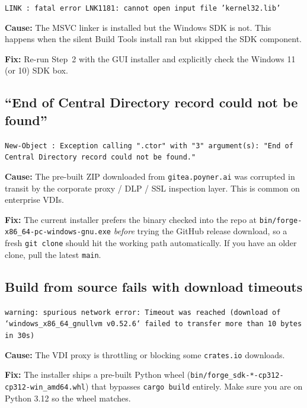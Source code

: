 \documentclass[11pt,letterpaper]{article}
\begin{document}
\begin{tcolorbox}[warnbox={Error}]
\texttt{LINK : fatal error LNK1181: cannot open input file 'kernel32.lib'}
\end{tcolorbox}

\textbf{Cause:} The MSVC linker is installed but the Windows SDK is not.
This happens when the silent Build Tools install ran but skipped the SDK
component.

\textbf{Fix:} Re-run Step~2 with the GUI installer and explicitly check
the Windows 11 (or 10) SDK box.

\subsection{``End of Central Directory record could not be found''}

\begin{tcolorbox}[warnbox={Error}]
\texttt{New-Object : Exception calling ".ctor" with "3" argument(s):
"End of Central Directory record could not be found."}
\end{tcolorbox}

\textbf{Cause:} The pre-built ZIP downloaded from
\texttt{gitea.poyner.ai} was corrupted in transit by the corporate
proxy / DLP / SSL inspection layer. This is common on enterprise VDIs.

\textbf{Fix:} The current installer prefers the binary checked into the
repo at \texttt{bin/forge-x86\_64-pc-windows-gnu.exe} \emph{before} trying
the GitHub release download, so a fresh \texttt{git clone} should hit
the working path automatically. If you have an older clone, pull the
latest \texttt{main}.

\subsection{Build from source fails with download timeouts}

\begin{tcolorbox}[warnbox={Error}]
\texttt{warning: spurious network error: Timeout was reached (download of
`windows\_x86\_64\_gnullvm v0.52.6` failed to transfer more than 10 bytes
in 30s)}
\end{tcolorbox}

\textbf{Cause:} The VDI proxy is throttling or blocking some
\texttt{crates.io} downloads.

\textbf{Fix:} The installer ships a pre-built Python wheel
(\texttt{bin/forge\_sdk-*-cp312-cp312-win\_amd64.whl}) that bypasses
\texttt{cargo build} entirely. Make sure you are on Python 3.12 so the
wheel matches.
\end{document}
